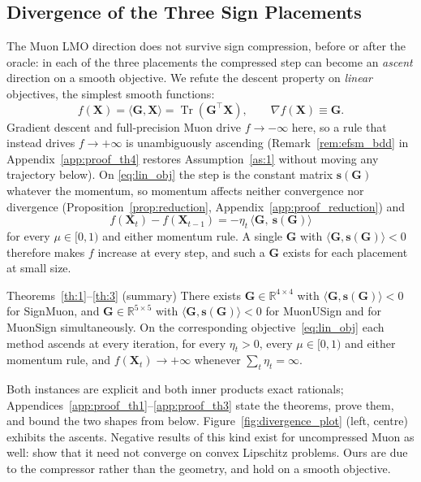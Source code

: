 \subsection{Divergence of the Three Sign Placements}
The Muon LMO direction does not survive sign compression, before or after the oracle: in each of the three placements the compressed step can become an \emph{ascent} direction on a smooth objective. We refute the descent property on \emph{linear} objectives, the simplest smooth functions:
\begin{equation}
\label{eq:lin_obj}
f(\mathbf{X})=\langle \mathbf{G},\mathbf{X}\rangle=\operatorname{Tr}(\mathbf{G}^\top\mathbf{X}),\qquad \nabla f(\mathbf{X})\equiv \mathbf{G}.
\end{equation}
Gradient descent and full-precision Muon drive $f\to-\infty$ here, so a rule that instead drives $f\to+\infty$ is unambiguously ascending (Remark~\ref{rem:efsm_bdd} in Appendix~\ref{app:proof_th4} restores Assumption~\ref{as:1} without moving any trajectory below). On \eqref{eq:lin_obj} the step is the constant matrix $\mathbf{s}(\mathbf{G})$ whatever the momentum, so momentum affects neither convergence nor divergence (Proposition~\ref{prop:reduction}, Appendix~\ref{app:proof_reduction}) and
\begin{equation}
\label{eq:lin_increment}
f(\mathbf{X}_{t})-f(\mathbf{X}_{t-1})=-\eta_t\,\bigl\langle \mathbf{G},\ \mathbf{s}(\mathbf{G})\bigr\rangle
\end{equation}
for every $\mu\in[0,1)$ and either momentum rule. A single $\mathbf{G}$ with $\langle\mathbf{G},\mathbf{s}(\mathbf{G})\rangle<0$ therefore makes $f$ increase at every step, and such a $\mathbf{G}$ exists for each placement at small size.

\begin{summarythm}{Theorems~\ref{th:1}--\ref{th:3} (summary)}
There exists $\mathbf{G}\in\mathbb{R}^{4\times4}$ with $\langle\mathbf{G},\mathbf{s}(\mathbf{G})\rangle<0$ for SignMuon, and $\mathbf{G}\in\mathbb{R}^{5\times5}$ with $\langle\mathbf{G},\mathbf{s}(\mathbf{G})\rangle<0$ for MuonUSign and for MuonSign simultaneously. On the corresponding objective~\eqref{eq:lin_obj} each method ascends at every iteration, for every $\eta_t>0$, every $\mu\in[0,1)$ and either momentum rule, and $f(\mathbf{X}_t)\to+\infty$ whenever $\sum_t\eta_t=\infty$.
\end{summarythm}

Both instances are explicit and both inner products exact rationals; Appendices~\ref{app:proof_th1}--\ref{app:proof_th3} state the theorems, prove them, and bound the two shapes from below. Figure~\ref{fig:divergence_plot} (left, centre) exhibits the ascents. Negative results of this kind exist for uncompressed Muon as well: \citet{parshakova2026muondoesconvergeconvex} show that it need not converge on convex Lipschitz problems. Ours are due to the compressor rather than the geometry, and hold on a smooth objective.

